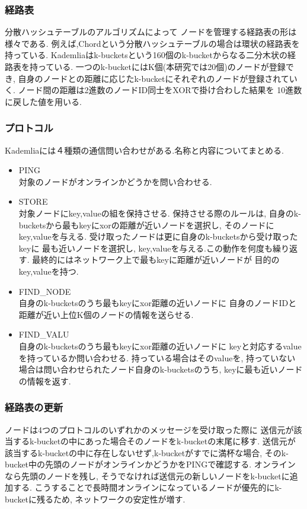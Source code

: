 \documentclass[sotsuron]{jcsie}
\begin{document}
\subsubsection{経路表}
分散ハッシュテーブルのアルゴリズムによって
ノードを管理する経路表の形は様々である.
例えば,Chordという分散ハッシュテーブルの場合は環状の経路表を持っている.
Kademliaはk-bucketsという160個のk-bucketからなる二分木状の経路表を持っている.
一つのk-bucketにはK個(本研究では20個)のノードが登録でき,
自身のノードとの距離に応じたk-bucketにそれぞれのノードが登録されていく.
ノード間の距離は2進数のノードID同士をXORで掛け合わした結果を
10進数に戻した値を用いる.
\subsubsection{プロトコル}
Kademliaには４種類の通信問い合わせがある.名称と内容についてまとめる.
\begin{itemize}
	\item {PING}\\
	      対象のノードがオンラインかどうかを問い合わせる.\\
	\item {STORE}\\
	      対象ノードにkey,valueの組を保持させる.
	      保持させる際のルールは,
	      自身のk-bucketsから最もkeyにxorの距離が近いノードを選択し,
	      そのノードにkey,valueを与える.
	      受け取ったノードは更に自身のk-bucketsから受け取ったkeyに
	      最も近いノードを選択し,
	      key,valueを与える.この動作を何度も繰り返す.
	      最終的にはネットワーク上で最もkeyに距離が近いノードが
	      目的のkey,valueを持つ.\\	      
	\item {FIND\_NODE}\\
	      自身のk-bucketsのうち最もkeyにxor距離の近いノードに
	      自身のノードIDと距離が近い上位K個のノードの情報を送らせる.\\	      
	\item {FIND\_VALU}\\
	      自身のk-bucketsのうち最もkeyにxor距離の近いノードに
	      keyと対応するvalueを持っているか問い合わせる.
	      持っている場合はそのvalueを,
	      持っていない場合は問い合わせられたノード自身のk-bucketsのうち,
	      keyに最も近いノードの情報を返す.\\
\end{itemize}

\subsubsection{経路表の更新}
ノードは4つのプロトコルのいずれかのメッセージを受け取った際に
送信元が該当するk-bucketの中にあった場合そのノードをk-bucketの末尾に移す.
送信元が該当するk-bucketの中に存在しないせず,k-bucketがすでに満杯な場合,
そのk-bucket中の先頭のノードがオンラインかどうかをPINGで確認する.
オンラインなら先頭のノードを残し,
そうでなければ送信元の新しいノードをk-bucketに追加する.
こうすることで長時間オンラインになっているノードが優先的にk-bucketに残るため,
ネットワークの安定性が増す.
\end{document}
